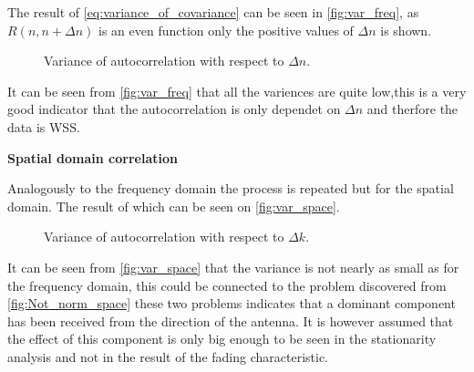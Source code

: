 The result of \autoref{eq:variance_of_covariance} can be seen in \autoref{fig:var_freq}, as $R(n,n+\Delta n)$ is an even function only the positive values of $\Delta n$ is shown.

\begin{figure}[H]
\centering

\caption{Variance of autocorrelation with respect to $\Delta n$.}
\label{fig:var_freq}
\end{figure}

It can be seen from \autoref{fig:var_freq} that all the variences are quite low,this is a very good indicator that the autocorrelation is only dependet on $\Delta n$ and therfore the data is WSS.

\textbf{Spatial domain correlation}

Analogously to the frequency domain the process is repeated but for the spatial domain. The result of which can be seen on \autoref{fig:var_space}.

\begin{figure}[H]
\centering

\caption{Variance of autocorrelation with respect to $\Delta k$.}
\label{fig:var_space}
\end{figure}

It can be seen from \autoref{fig:var_space} that the variance is not nearly as small as for the frequency domain, this could be connected to the problem discovered from \autoref{fig:Not_norm_space} these two problems indicates that a dominant component has been received from the direction of the antenna. It is however assumed that the effect of this component is only big enough to be seen in the stationarity analysis and not in the result of the fading characteristic.
